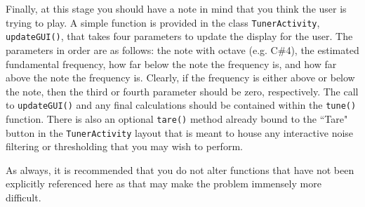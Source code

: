 Finally, at this stage you should have a note in mind that you think the user is trying to play.
A simple function is provided in the class \verb=TunerActivity=, \verb=updateGUI()=, that takes four parameters to update the display for the user.
The parameters in order are as follows: the note with octave (e.g. C\#4),  the estimated fundamental frequency, how far below the note the frequency is, and how far above the note the frequency is.
Clearly, if the frequency is either above or below the note, then the third or fourth parameter should be zero, respectively.
The call to \verb=updateGUI()= and any final calculations should be contained within the \verb=tune()= function.
There is also an optional \verb=tare()= method already bound to the ``Tare" button in the \verb=TunerActivity= layout that is meant to house any interactive noise filtering or thresholding that you may wish to perform.

As always, it is recommended that you do not alter functions that have not been explicitly referenced here as that may make the problem immensely more difficult.

